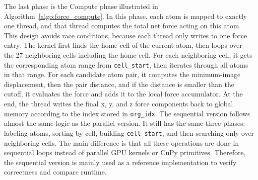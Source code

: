 \documentclass[12pt]{article}
\begin{document}
The last phase is the Compute phase illustrated in Algorithm~\ref{algo:force_compute}. In this phase, each atom is mapped to exactly one thread, and that thread computes the total net force acting on this atom. This design avoids race conditions, because each thread only writes to one force entry. The kernel first finds the home cell of the current atom, then loops over the 27 neighboring cells including the home cell. For each neighboring cell, it gets the corresponding atom range from \texttt{cell\_start}, then iterates through all atoms in that range. For each candidate atom pair, it computes the minimum-image displacement, then the pair distance, and if the distance is smaller than the cutoff, it evaluates the force and adds it to the local force accumulator. At the end, the thread writes the final x, y, and z force components back to global memory according to the index stored in \texttt{org\_idx}.
The sequential version follows almost the same logic as the parallel version. It still has the same three phases: labeling atoms, sorting by cell, building \texttt{cell\_start}, and then searching only over neighboring cells. The main difference is that all these operations are done in sequential loops instead of parallel GPU kernels or CuPy primitives. Therefore, the sequential version is mainly used as a reference implementation to verify correctness and compare runtime.
\end{document}
